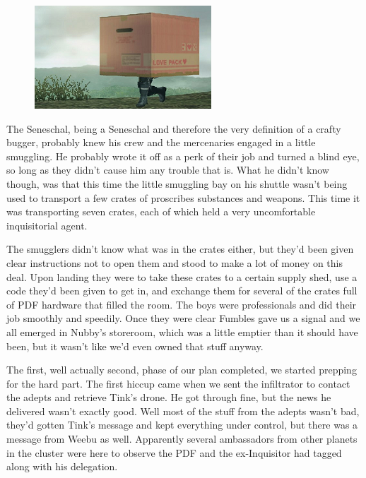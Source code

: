 \begin{figure}
	\begin{center}
		\includegraphics[width=\figwidth]{pics/10/60.png}
	\end{center}
\end{figure}
The Seneschal, being a Seneschal and therefore the very definition of a crafty bugger, probably knew his crew and the mercenaries engaged in a little smuggling. 
He probably wrote it off as a perk of their job and turned a blind eye, so long as they didn't cause him any trouble that is. 
What he didn't know though, was that this time the little smuggling bay on his shuttle wasn't being used to transport a few crates of proscribes substances and weapons. 
This time it was transporting seven crates, each of which held a very uncomfortable inquisitorial agent.

The smugglers didn't know what was in the crates either, but they'd been given clear instructions not to open them and stood to make a lot of money on this deal. 
Upon landing they were to take these crates to a certain supply shed, use a code they'd been given to get in, and exchange them for several of the crates full of PDF hardware that filled the room. 
The boys were professionals and did their job smoothly and speedily. 
Once they were clear Fumbles gave us a signal and we all emerged in Nubby's storeroom, which was a little emptier than it should have been, but it wasn't like we'd even owned that stuff anyway.

The first, well actually second, phase of our plan completed, we started prepping for the hard part. 
The first hiccup came when we sent the infiltrator to contact the adepts and retrieve Tink's drone. 
He got through fine, but the news he delivered wasn't exactly good. 
Well most of the stuff from the adepts wasn't bad, they'd gotten Tink's message and kept everything under control, but there was a message from Weebu as well. 
Apparently several ambassadors from other planets in the cluster were here to observe the PDF and the ex-Inquisitor had tagged along with his delegation.


